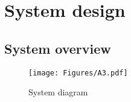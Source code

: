 
\chapter{System design}
\vspace{-1cm}
\section{System overview} \label{sec:system}

\begin{figure}[H]
    \centering
    \texttt{[image: Figures/A3.pdf]}
    \caption{System diagram}
    \label{fig:system_diagram}
\end{figure}

